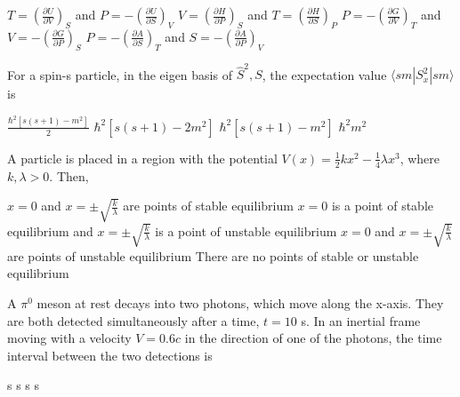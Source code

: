 \documentclass{exam}
\begin{document}
\begin{questions}
\begin{choices}
	\begin{multicols}{2}
	 \choice $T = \left(\frac{\partial U}{\partial V}\right)_{S}$ and $P = -\left(\frac{\partial U}{\partial S}\right)_{V}$
	\choice $V = \left(\frac{\partial H}{\partial P}\right)_{S}$ and $T = \left(\frac{\partial H}{\partial S}\right)_{P}$
	\choice $P = -\left(\frac{\partial G}{\partial V}\right)_{T}$ and $V = -\left(\frac{\partial G}{\partial P}\right)_{S}$
	\choice $P = -\left(\frac{\partial A}{\partial S}\right)_{T}$ and $S = -\left(\frac{\partial A}{\partial P}\right)_{V}$
	\end{multicols}
\end{choices}

\question For a spin-s particle, in the eigen basis of $\hat{S}^2,S$, the expectation value $\langle s m | S_x^2 | s m \rangle$ is\hfill{}

\begin{choices}
	\begin{multicols}{2}
	 \choice $\frac{\hbar^2[s(s+1)-m^2]}{2}$ \choice $\hbar^2[s(s+1)-2m^2]$
	\choice $\hbar^2[s(s+1)-m^2]$ \choice $\hbar^2 m^2$
	\end{multicols}
\end{choices}

\question A particle is placed in a region with the potential $V(x)=\frac{1}{2}kx^2-\frac{1}{4}\lambda x^3$, where $k, \lambda > 0$. Then,\hfill{}

\begin{choices}
	\choice $x=0$ and $x=\pm\sqrt{\frac{k}{\lambda}}$ are points of stable equilibrium
	\choice $x=0$ is a point of stable equilibrium and $x=\pm\sqrt{\frac{k}{\lambda}}$ is a point of unstable equilibrium
	\choice $x=0$ and $x=\pm\sqrt{\frac{k}{\lambda}}$ are points of unstable equilibrium
	\choice There are no points of stable or unstable equilibrium
\end{choices}

\question A $\pi^0$ meson at rest decays into two photons, which move along the x-axis. They are both detected simultaneously after a time, $t=10$ s. In an inertial frame moving with a velocity $V=0.6c$ in the direction of one of the photons, the time interval between the two detections is\hfill{}

\begin{oneparchoices}
	 s  s  s  s
\end{oneparchoices}


\end{questions}
\end{document}
